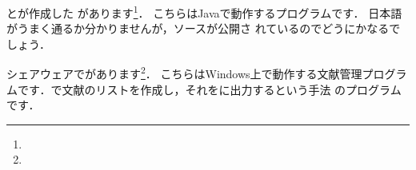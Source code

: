 とが作成した
があります\footnote{\webJabRef}．
こちらはJavaで動作するプログラムです．
日本語がうまく通るか分かりませんが，ソースが公開さ
れているのでどうにかなるでしょう．

シェアウェアでがあります\footnote{\webRefforWin}．
こちらはWindows上で動作する文献管理プログラムです．で文献のリストを作成し，それをに出力するという手法
のプログラムです．



